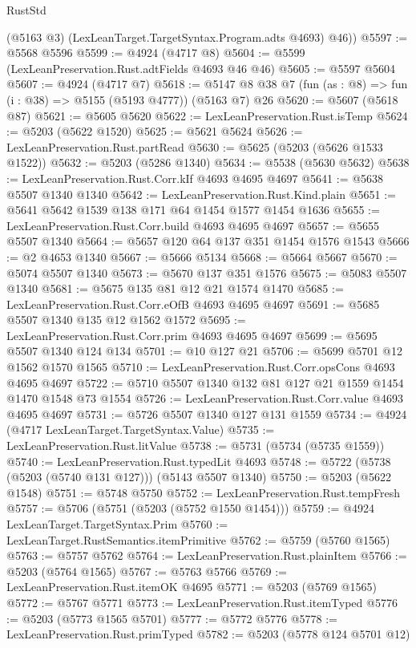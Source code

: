 \begin{lexlean}{RustStd}
\begin{coremodule}
        (@5163 @3)
        (LexLeanTarget.TargetSyntax.Program.adts @4693)
        @46))
@5597 := @5568 @5596
@5599 := @4924 (@4717 @8)
@5604 := @5599 (LexLeanPreservation.Rust.adtFields @4693 @46 @46)
@5605 := @5597 @5604
@5607 := @4924 (@4717 @7)
@5618 := @5147 @8 @38 @7 (fun (as : @8) => fun (i : @38) => @5155 (@5193 @4777)) (@5163 @7) @26
@5620 := @5607 (@5618 @87)
@5621 := @5605 @5620
@5622 := LexLeanPreservation.Rust.isTemp
@5624 := @5203 (@5622 @1520)
@5625 := @5621 @5624
@5626 := LexLeanPreservation.Rust.partRead
@5630 := @5625 (@5203 (@5626 @1533 @1522))
@5632 := @5203 (@5286 @1340)
@5634 := @5538 (@5630 @5632)
@5638 := LexLeanPreservation.Rust.Corr.kIf @4693 @4695 @4697
@5641 := @5638 @5507 @1340 @1340
@5642 := LexLeanPreservation.Rust.Kind.plain
@5651 := @5641 @5642 @1539 @138 @171 @64 @1454 @1577 @1454 @1636
@5655 := LexLeanPreservation.Rust.Corr.build @4693 @4695 @4697
@5657 := @5655 @5507 @1340
@5664 := @5657 @120 @64 @137 @351 @1454 @1576 @1543
@5666 := @2 @4653 @1340
@5667 := @5666 @5134
@5668 := @5664 @5667
@5670 := @5074 @5507 @1340
@5673 := @5670 @137 @351 @1576
@5675 := @5083 @5507 @1340
@5681 := @5675 @135 @81 @12 @21 @1574 @1470
@5685 := LexLeanPreservation.Rust.Corr.eOfB @4693 @4695 @4697
@5691 := @5685 @5507 @1340 @135 @12 @1562 @1572
@5695 := LexLeanPreservation.Rust.Corr.prim @4693 @4695 @4697
@5699 := @5695 @5507 @1340 @124 @134
@5701 := @10 @127 @21
@5706 := @5699 @5701 @12 @1562 @1570 @1565
@5710 := LexLeanPreservation.Rust.Corr.opsCons @4693 @4695 @4697
@5722 := @5710 @5507 @1340 @132 @81 @127 @21 @1559 @1454 @1470 @1548 @73 @1554
@5726 := LexLeanPreservation.Rust.Corr.value @4693 @4695 @4697
@5731 := @5726 @5507 @1340 @127 @131 @1559
@5734 := @4924 (@4717 LexLeanTarget.TargetSyntax.Value)
@5735 := LexLeanPreservation.Rust.litValue
@5738 := @5731 (@5734 (@5735 @1559))
@5740 := LexLeanPreservation.Rust.typedLit @4693
@5748 := @5722 (@5738 (@5203 (@5740 @131 @127))) (@5143 @5507 @1340)
@5750 := @5203 (@5622 @1548)
@5751 := @5748 @5750
@5752 := LexLeanPreservation.Rust.tempFresh
@5757 := @5706 (@5751 (@5203 (@5752 @1550 @1454)))
@5759 := @4924 LexLeanTarget.TargetSyntax.Prim
@5760 := LexLeanTarget.RustSemantics.itemPrimitive
@5762 := @5759 (@5760 @1565)
@5763 := @5757 @5762
@5764 := LexLeanPreservation.Rust.plainItem
@5766 := @5203 (@5764 @1565)
@5767 := @5763 @5766
@5769 := LexLeanPreservation.Rust.itemOK @4695
@5771 := @5203 (@5769 @1565)
@5772 := @5767 @5771
@5773 := LexLeanPreservation.Rust.itemTyped
@5776 := @5203 (@5773 @1565 @5701)
@5777 := @5772 @5776
@5778 := LexLeanPreservation.Rust.primTyped
@5782 := @5203 (@5778 @124 @5701 @12)

\end{coremodule}
\end{lexlean}
